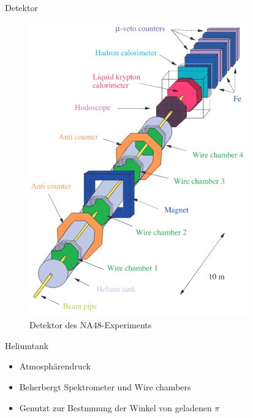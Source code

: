 \documentclass[aspectratio=1610, professionalfonts, 9pt, t]{beamer}
\begin{document}
  \begin{frame}{Detektor}
    \begin{figure}[ht]
      \begin{center}
        \includegraphics[height=0.8\textheight]{Images/na48detector.png} %
        \caption{Detektor des NA48-Experiments}
      \end{center}
    \end{figure}
  \end{frame}

  \begin{frame}{Heliumtank}
    \begin{itemize}
      \item Atmosphärendruck
      \item Beherbergt Spektrometer und Wire chambers
      \item[\rightarrow] Genutzt zur Bestmmung der Winkel von geladenen $\pi$
    \end{itemize}
  \end{frame}
\end{document}
